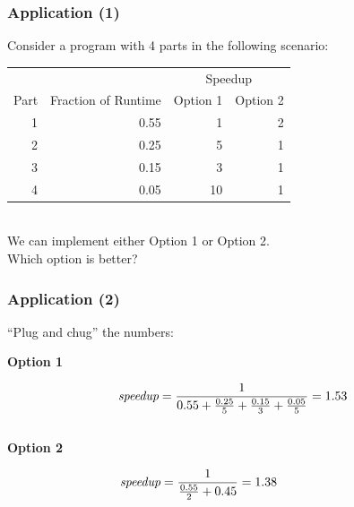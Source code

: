 \documentclass[aspectratio=43]{beamer}
\begin{document}
\begin{frame}
  \frametitle{Application (1)}

  \hspace*{2em} 
  \begin{minipage}{.8\textwidth} Consider a program with 4 parts in the following scenario:\\[2em]
    \begin{tabular}{r|r|r|r}
    \multicolumn{2}{l}{} & \multicolumn{2}{c}{Speedup} \\
    Part & Fraction of Runtime & Option 1 & Option 2\\
    \hline
    1 & 0.55 & 1  & 2\\
    2 & 0.25 & 5  & 1\\
    3 & 0.15 & 3  & 1\\
    4 & 0.05  & 10 & 1\\
  \end{tabular}

~\\[2em]
  We can implement either Option 1 or Option 2. \\
  Which option is better?
  \end{minipage}
\end{frame}

\begin{frame}
  \frametitle{Application (2)}

\begin{minipage}{.8\textwidth}
  \hspace*{2em} ``Plug and chug'' the numbers:\\[1em]
\hspace*{.2\textwidth}\begin{minipage}{.8\textwidth}
  {\bf Option 1} \vspace*{-2em}

  \[ \mbox{\em speedup} = \frac{1}{0.55 + \frac{0.25}{5} + \frac{0.15}{3} + \frac{0.05}{5}}
    = 1.53  \]
~\\[1em]
  {\bf Option 2} \vspace*{-2em}

   \[\mbox{\em speedup} = \frac{1}{\frac{0.55}{2} + 0.45} = 1.38 \hspace*{5.5em}\]
\end{minipage}
\end{minipage}

\end{frame}
\end{document}
